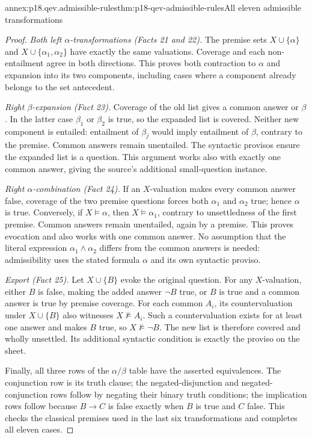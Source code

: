 \begin{annexitem}{annex:p18.qev.admissible-rules}{thm:p18-qev-admissible-rules}{All eleven admissible transformations}
\begin{proof}
\emph{Both left \(\alpha\)-transformations (Facts 21 and 22).}
The premise sets \(X\cup\{\alpha\}\) and
\(X\cup\{\alpha_1,\alpha_2\}\) have exactly the same
valuations. Coverage and each non-entailment agree in both directions.
This proves both contraction to \(\alpha\) and expansion into
its two components, including cases where a component already belongs
to the set antecedent.

\emph{Right \(\beta\)-expansion (Fact 23).} Coverage of the old
list gives a common answer or \(\beta\). In the latter case
\(\beta_1\) or \(\beta_2\) is true, so the expanded list
is covered. Neither new component is entailed: entailment of
\(\beta_j\) would imply entailment of \(\beta\), contrary
to the premise. Common answers remain unentailed. The syntactic
provisos ensure the expanded list is a question. This argument works
also with exactly one common answer, giving the source's additional
small-question instance.

\emph{Right \(\alpha\)-combination (Fact 24).} If an
\(X\)-valuation makes every common answer false, coverage of the
two premise questions forces both \(\alpha_1\) and
\(\alpha_2\) true; hence \(\alpha\) is true. Conversely,
if \(X\models\alpha\), then \(X\models\alpha_1\),
contrary to unsettledness of the first premise. Common answers remain
unentailed, again by a premise. This proves evocation and also works
with one common answer. No assumption that the literal expression
\(\alpha_1\land\alpha_2\) differs from the common answers
is needed: admissibility uses the stated formula \(\alpha\)
and its own syntactic proviso.

\emph{Export (Fact 25).} Let \(X\cup\{B\}\) evoke the
original question. For any \(X\)-valuation, either \(B\) is
false, making the added answer \(\neg B\) true, or \(B\)
is true and a common answer is true by premise coverage. For each
common \(A_i\), its countervaluation under \(X\cup\{B\}\)
also witnesses \(X\not\models A_i\). Such a countervaluation
exists for at least one answer and makes \(B\) true, so
\(X\not\models\neg B\). The new list is therefore covered
and wholly unsettled. Its additional syntactic condition is exactly
the proviso on the sheet.

Finally, all three rows of the \(\alpha/\beta\) table have the
asserted equivalences. The conjunction row is its truth clause; the
negated-disjunction and negated-conjunction rows follow by negating
their binary truth conditions; the implication rows follow because
\(B\to C\) is false exactly when \(B\) is true and \(C\)
false. This checks the classical premises used in the last six
transformations and completes all eleven cases.
\end{proof}
\end{annexitem}

